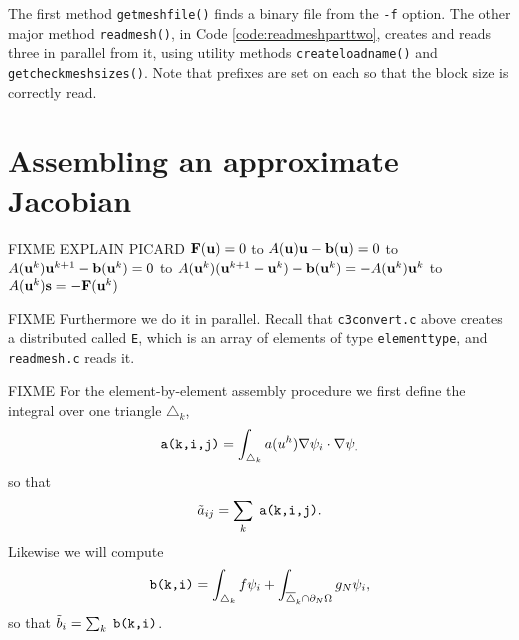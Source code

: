 The first method \texttt{getmeshfile()} finds a \PETSc binary file from the \texttt{-f} option.  The other major method \texttt{readmesh()}, in Code \ref{code:readmeshparttwo}, creates and reads three \pVecs in parallel from it, using utility methods \texttt{createloadname()} and \texttt{getcheckmeshsizes()}.  Note that prefixes are set on each \pVec so that the block size is correctly read.




\section{Assembling an approximate Jacobian}

FIXME EXPLAIN PICARD $\mathbf{F}(\mathbf{u})=0$ to $A(\mathbf{u}) \mathbf{u} - \mathbf{b}(\mathbf{u})=0$ to $A(\mathbf{u}^k) \mathbf{u}^{k+1} - \mathbf{b}(\mathbf{u}^k)=0$ to $A(\mathbf{u}^k) (\mathbf{u}^{k+1}-\mathbf{u}^k) - \mathbf{b}(\mathbf{u}^k)= - A(\mathbf{u}^k) \mathbf{u}^k$ to $A(\mathbf{u}^k) \mathbf{s} = -\mathbf{F}(\mathbf{u}^k)$

FIXME Furthermore we do it in parallel.  Recall that \texttt{c3convert.c} above creates a distributed \pVec called \texttt{E}, which is an array of elements of type \texttt{elementtype}, and \texttt{readmesh.c} reads it.

FIXME For the element-by-element assembly procedure we first define the integral over one triangle $\triangle_k$,
\begin{equation}
\text{\texttt{a(k,i,j)}} = \int_{\triangle_k} a(u^h) \nabla \psi_i \cdot \nabla \psi_. \label{aelementintegral}
\end{equation}
so that
    $$\tilde a_{ij} = \sum_k \phantom{.}\text{\texttt{a(k,i,j)}}.$$
Likewise we will compute
\begin{equation}
\text{\texttt{b(k,i)}} = \int_{\triangle_k} f \psi_i + \int_{\overline{\triangle}_k \cap \partial_N\Omega} g_N \psi_i, \label{belementintegral}
\end{equation}
so that $\tilde b_i = \sum_{k} \;\text{\texttt{b(k,i)}}$.

